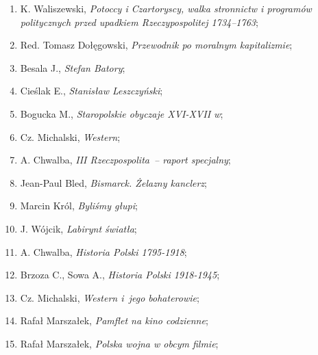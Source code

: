 \documentclass[a4paper,11pt]{article}
\begin{document}
\begin{enumerate}
\item K. Waliszewski, \textit{Potoccy i Czartoryscy, walka stronnictw i
    programów politycznych przed upadkiem Rzeczypospolitej 1734--1763};



\item Red. Tomasz Dołęgowski, \textit{Przewodnik po moralnym
    kapitalizmie};



\item Besala J., \textit{Stefan Batory};



\item Cieślak E., \textit{Stanisław Leszczyński};



\item Bogucka M., \textit{Staropolskie obyczaje XVI-XVII w};



\item Cz. Michalski, \textit{Western};



\item A. Chwalba, \textit{III Rzeczpospolita~-- raport specjalny};



\item Jean-Paul Bled, \textit{Bismarck. Żelazny kanclerz};



\item Marcin Król, \textit{Byliśmy głupi};



\item J. Wójcik, \textit{Labirynt światła};



\item A. Chwalba, \textit{Historia Polski 1795-1918};



\item Brzoza C., Sowa A., \textit{Historia Polski 1918-1945};



\item Cz. Michalski, \textit{Western i~jego bohaterowie};



\item Rafał Marszałek, \textit{Pamflet na kino codzienne};



\item Rafał Marszałek, \textit{Polska wojna w obcym filmie};




\end{enumerate}
\end{document}
